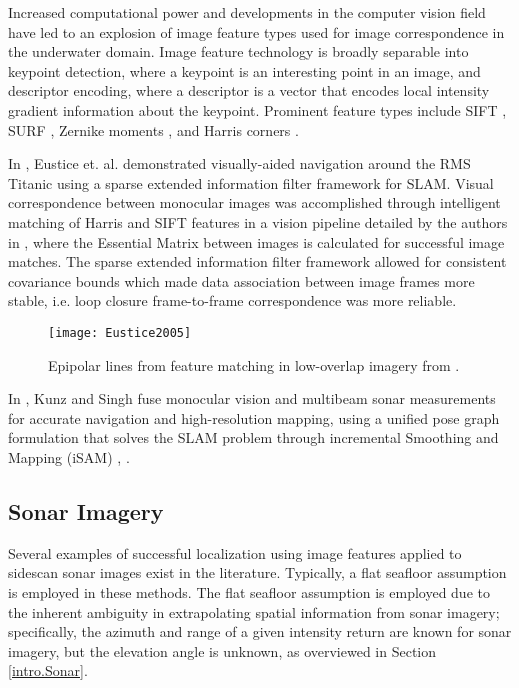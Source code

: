 Increased computational power and developments in the computer vision field have led to an explosion of image feature types used for image correspondence in the underwater domain.
Image feature technology is broadly separable into keypoint detection, where a keypoint is an interesting point in an image, and descriptor encoding, where a descriptor is a vector that encodes local intensity gradient information about the keypoint.
Prominent feature types include SIFT \cite{Lowe2004}, SURF \cite{Bay2006}, Zernike moments \cite{Khotanzad1990}, and Harris corners \cite{Harris1988}.

In \cite{Eustice2005}, Eustice et. al. demonstrated visually-aided navigation around the RMS Titanic using a sparse extended information filter \cite{Thrun03d} framework for SLAM.
Visual correspondence between monocular images was accomplished through intelligent matching of Harris and SIFT features in a vision pipeline detailed by the authors in \cite{Eustice2004}, where the Essential Matrix \cite{Longuet1981} between images is calculated for successful image matches.
The sparse extended information filter framework allowed for consistent covariance bounds which made data association between image frames more stable, i.e. loop closure frame-to-frame correspondence was more reliable.

\begin{figure}[!h!]
	\centering
		\texttt{[image: Eustice2005]}
	\caption{Epipolar lines from feature matching in low-overlap imagery from \cite{Eustice2005}. }
\end{figure}

In \cite{Kunz2013}, Kunz and Singh fuse monocular vision and multibeam sonar measurements for accurate navigation and high-resolution mapping, using a unified pose graph formulation that solves the SLAM problem through incremental Smoothing and Mapping (iSAM) \cite{Dellaert2006}, \cite{Kaess2008}.

\subsection{Sonar Imagery}
\label{related.Feature.Sonar}

Several examples of successful localization using image features applied to sidescan sonar images exist in the literature. 
Typically, a flat seafloor assumption is employed in these methods.
The flat seafloor assumption is employed due to the inherent ambiguity in extrapolating spatial information from sonar imagery; specifically, the azimuth and range of a given intensity return are known for sonar imagery, but the elevation angle is unknown, as overviewed in Section \ref{intro.Sonar}.  

